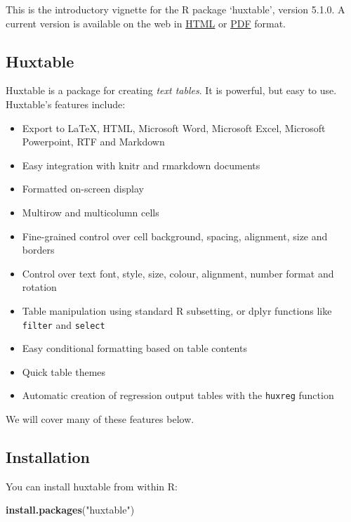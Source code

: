 \documentclass[]{article}
\newenvironment{Shaded}{\begin{snugshade}}{\end{snugshade}}
\newcommand{\KeywordTok}[1]{\textcolor[rgb]{0.13,0.29,0.53}{\textbf{#1}}}
\newcommand{\NormalTok}[1]{#1}
\newcommand{\StringTok}[1]{\textcolor[rgb]{0.31,0.60,0.02}{#1}}
\providecommand{\tightlist}{%
  \setlength{\itemsep}{0pt}\setlength{\parskip}{0pt}}
\begin{document}
This is the introductory vignette for the R package `huxtable', version
5.1.0. A current version is available on the web in
\href{https://hughjonesd.github.io/huxtable/huxtable.html}{HTML} or
\href{https://hughjonesd.github.io/huxtable/huxtable.pdf}{PDF} format.

\hypertarget{huxtable}{%
\subsection{Huxtable}\label{huxtable}}

Huxtable is a package for creating \emph{text tables}. It is powerful,
but easy to use. Huxtable's features include:

\begin{itemize}
\tightlist
\item
  Export to LaTeX, HTML, Microsoft Word, Microsoft Excel, Microsoft
  Powerpoint, RTF and Markdown
\item
  Easy integration with knitr and rmarkdown documents
\item
  Formatted on-screen display
\item
  Multirow and multicolumn cells
\item
  Fine-grained control over cell background, spacing, alignment, size
  and borders
\item
  Control over text font, style, size, colour, alignment, number format
  and rotation
\item
  Table manipulation using standard R subsetting, or dplyr functions
  like \texttt{filter} and \texttt{select}
\item
  Easy conditional formatting based on table contents
\item
  Quick table themes
\item
  Automatic creation of regression output tables with the
  \texttt{huxreg} function
\end{itemize}

We will cover many of these features below.

\hypertarget{installation}{%
\subsection{Installation}\label{installation}}

You can install huxtable from within R:

\begin{Shaded}
\begin{Highlighting}[]
\KeywordTok{install.packages}\NormalTok{(}\StringTok{"huxtable"}\NormalTok{)}
\end{Highlighting}
\end{Shaded}
\end{document}
